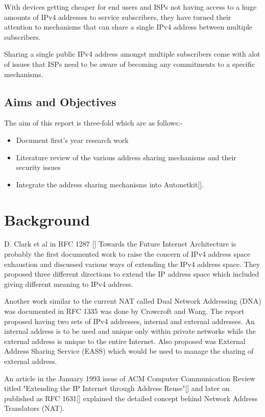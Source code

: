 \documentclass[iwp,first]{luthesis}
\begin{document}
With devices getting cheaper for end users and ISPs not having access to a huge amounts of IPv4 addresses to service subscribers, they have turned their attention to mechanisms that can share a single IPv4 address between multiple subscribers. 

Sharing a single public IPv4 address amongst multiple subscribers come with alot of issues that ISPs need to be aware of becoming any commitments to a specific mechanisms. 


\section{Aims and Objectives}
The aim of this report is three-fold which are as follows:-

\begin{itemize}
\item Document first's year research work

\item Literature review of  the various address sharing mechanisms and their security issues

\item Integrate the address sharing mechanisms into Autonetkit[].

\end{itemize}



\chapter{Background}

D. Clark et al in RFC 1287 [] Towards the Future Internet Architecture is probably the first documented work to raise the concern of IPv4 address space exhaustion and discussed various ways of extending the IPv4 address space. They proposed three different directions to extend the IP address space which included giving different meaning to IPv4 address. 

Another work similar to the current NAT called Dual Network Addressing (DNA) was documented in RFC 1335 was done by Crowcroft and Wang. The report proposed having two sets of IPv4 addresses, internal and external addresses. An internal address is to be used and unique only within private networks while the external address is unique to the entire Internet. Also proposed was External Address Sharing Service (EASS) which would be used to manage the sharing of external address. 

An article in the January 1993 issue of ACM Computer Communication Review titled "Extending the IP Internet through Address Reuse"[] and later on published as RFC 1631[] explained the detailed concept behind Network Address Translators (NAT). 
\end{document}
